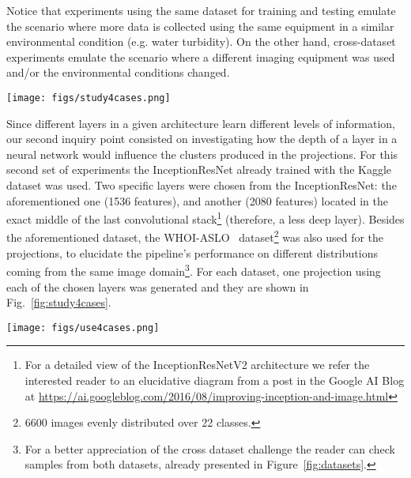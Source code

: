 \documentclass[sn-basic]{sn-jnl}%
\theoremstyle{thmstyleone}%
\theoremstyle{thmstyletwo}%
\theoremstyle{thmstylethree}%
\begin{document}
Notice that experiments using the same dataset for training and testing emulate the scenario where more data is collected using the same equipment in a similar environmental condition (e.g. water turbidity). On the other hand, cross-dataset experiments emulate the scenario where a different imaging equipment was used and/or the environmental conditions changed.

\begin{figure*}[htb]
\centerline{\texttt{[image: figs/study4cases.png]}}
\caption{InceptionResNet trained with the Kaggle dataset and projections of the Kaggle dataset (top panels) and of the WHOI-ASLO dataset (bottom panels). Right panels show projections using features from the last convolutional layer; left panels show projections using features from an earlier convolutional layer.}
\label{fig:study4cases}
\end{figure*}

Since different layers in a given architecture learn different levels of information, our second inquiry point consisted on investigating how the depth of a layer in a neural network would influence the clusters produced in the projections. For this second set of experiments the InceptionResNet already trained with the Kaggle dataset was used. Two specific layers were chosen from the InceptionResNet: the aforementioned one (1536 features), and another (2080 features) located in the exact middle of the last convolutional stack\footnote{For a detailed view of the InceptionResNetV2 architecture we refer the interested reader to an elucidative diagram from a post in the Google AI Blog at \url{https://ai.googleblog.com/2016/08/improving-inception-and-image.html}} (therefore, a less deep layer). Besides the aforementioned dataset, the WHOI-ASLO~\citep{sosik-paper} dataset\footnote{6600 images evenly distributed over 22 classes.} was also used for the projections, to elucidate the pipeline's performance on different distributions coming from the same image domain\footnote{For a better appreciation of the cross dataset challenge the reader can check samples from both datasets, already presented in Figure~\ref{fig:datasets}.}. For each dataset, one projection using each of the chosen layers was generated and they are shown in Fig.~\ref{fig:study4cases}.



\begin{figure*}[htb]
\centerline{\texttt{[image: figs/use4cases.png]}}
\caption{An actual visual interactive labelling scenario. Top left panel shows a projection with all points in black, since the labels are not there yet. Top right panels show the actual images instead of the points, at the same positions; selections for 2 regions (in green and red), to be inspected in more detail with magnification, are also depicted. Bottom panels show zoom around the red selection (left), highlighting a dense region with fuzzy clusters, and around the green selection (right), highlighting a sparse region with clean clusters separation.}
\label{fig:use4cases}
\end{figure*}
\end{document}
